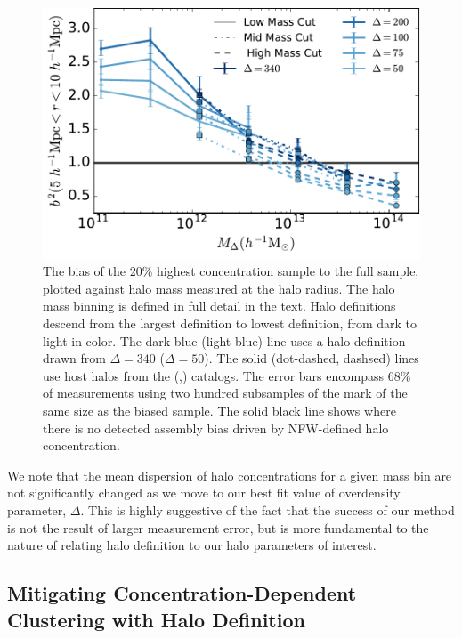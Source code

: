 \documentclass[usenatbib,fleqn]{mnras}
\begin{document}
\begin{figure}
	\centering
	\includegraphics[width=.8\textwidth]{biasplot.pdf}
	\caption{
	The bias of the 20\% highest concentration sample to the full sample, plotted against halo mass measured at the halo radius. The halo mass binning is defined in full detail in the text. Halo definitions descend from the largest definition to lowest definition, from dark to light in color. The dark blue (light blue) line uses a halo definition drawn from $\Delta = 340$ ($\Delta = 50$). The solid (dot-dashed, dashsed) lines use host halos from the \simA (\simB,\simC) catalogs. The
	error bars encompass 68\% of measurements using two hundred subsamples
	of the mark of the same size as the biased sample. The solid black line
	shows where there is no detected assembly bias driven by NFW-defined halo concentration.}
	\label{fig:biascompare}
\end{figure}



We note that the mean dispersion of halo concentrations for a given mass
bin are not significantly changed as we move to our best fit value of
overdensity parameter, $\Delta$. This is highly suggestive of the fact
that the success of our method is not the result of larger measurement
error, but is more fundamental to the nature of relating halo definition to
our halo parameters of interest.


\subsection{Mitigating Concentration-Dependent Clustering with Halo Definition}
\end{document}
